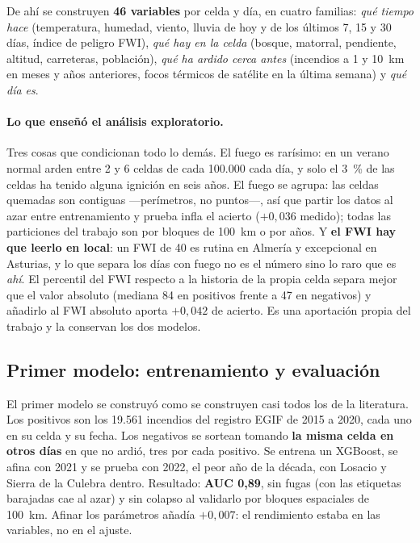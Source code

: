 \documentclass[11pt,a4paper]{article}
\begin{document}
De ahí se construyen \textbf{46 variables} por celda y día, en cuatro
familias: \emph{qué tiempo hace} (temperatura, humedad, viento, lluvia de hoy
y de los últimos 7, 15 y 30 días, índice de peligro FWI), \emph{qué hay en la
celda} (bosque, matorral, pendiente, altitud, carreteras, población),
\emph{qué ha ardido cerca antes} (incendios a 1 y 10~km en meses y años
anteriores, focos térmicos de satélite en la última semana) y \emph{qué día
es}.

\paragraph{Lo que enseñó el análisis exploratorio.} Tres cosas que
condicionan todo lo demás. El fuego es rarísimo: en un verano normal arden
entre 2 y 6 celdas de cada 100.000 cada día, y solo el 3~\% de las celdas ha
tenido alguna ignición en seis años. El fuego se agrupa: las celdas quemadas
son contiguas ---perímetros, no puntos---, así que partir los datos al azar
entre entrenamiento y prueba infla el acierto ($+0,036$ medido); todas las
particiones del trabajo son por bloques de 100~km o por años. Y \textbf{el FWI
hay que leerlo en local}: un FWI de 40 es rutina en Almería y excepcional en
Asturias, y lo que separa los días con fuego no es el número sino lo raro que
es \emph{ahí}. El percentil del FWI respecto a la historia de la propia celda
separa mejor que el valor absoluto (mediana 84 en positivos frente a 47 en
negativos) y añadirlo al FWI absoluto aporta $+0,042$ de acierto. Es una aportación propia del trabajo
y la conservan los dos modelos.

\subsection{Primer modelo: entrenamiento y evaluación}

El primer modelo se construyó como se construyen casi todos los de la
literatura. Los positivos son los 19.561 incendios del registro EGIF de 2015 a
2020, cada uno en su celda y su fecha. Los negativos se sortean tomando
\textbf{la misma celda en otros días} en que no ardió, tres por cada positivo.
Se entrena un XGBoost, se afina con 2021 y se prueba con 2022, el peor año de
la década, con Losacio y Sierra de la Culebra dentro. Resultado: \textbf{AUC
0,89}, sin fugas (con las etiquetas barajadas cae al azar) y sin colapso al
validarlo por bloques espaciales de 100~km. Afinar los parámetros añadía $+0,007$: el
rendimiento estaba en las variables, no en el ajuste.
\end{document}
